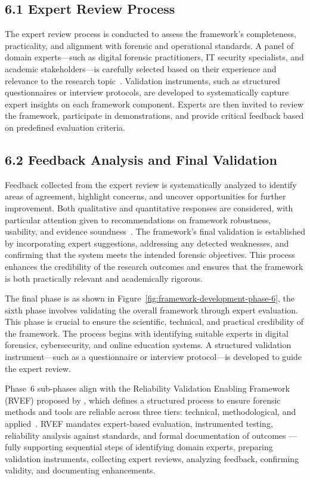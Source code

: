 \subsection{6.1 Expert Review Process}

The expert review process is conducted to assess the framework’s completeness, practicality, and alignment with forensic and operational standards. A panel of domain experts—such as digital forensic practitioners, IT security specialists, and academic stakeholders—is carefully selected based on their experience and relevance to the research topic~\cite{adel2024ethicore, hevner2004design}. Validation instruments, such as structured questionnaires or interview protocols, are developed to systematically capture expert insights on each framework component. Experts are then invited to review the framework, participate in demonstrations, and provide critical feedback based on predefined evaluation criteria.

\subsection{6.2 Feedback Analysis and Final Validation}

Feedback collected from the expert review is systematically analyzed to identify areas of agreement, highlight concerns, and uncover opportunities for further improvement. Both qualitative and quantitative responses are considered, with particular attention given to recommendations on framework robustness, usability, and evidence soundness~\cite{bass2012softwarearch}. The framework’s final validation is established by incorporating expert suggestions, addressing any detected weaknesses, and confirming that the system meets the intended forensic objectives. This process enhances the credibility of the research outcomes and ensures that the framework is both practically relevant and academically rigorous.

The final phase is as shown in Figure~\ref{fig:framework-development-phase-6}, the sixth phase involves validating the overall framework through expert evaluation. This phase is crucial to ensure the scientific, technical, and practical credibility of the framework. The process begins with identifying suitable experts in digital forensics, cybersecurity, and online education systems. A structured validation instrument—such as a questionnaire or interview protocol—is developed to guide the expert review.

Phase~6 sub-phases align with the Reliability Validation Enabling Framework (RVEF) proposed by \citet{stoykova2023rvef}, which defines a structured process to ensure forensic methods and tools are reliable across three tiers: technical, methodological, and applied~\cite{stoykova2023rvef}. RVEF mandates expert-based evaluation, instrumented testing, reliability analysis against standards, and formal documentation of outcomes — fully supporting sequential steps of identifying domain experts, preparing validation instruments, collecting expert reviews, analyzing feedback, confirming validity, and documenting enhancements.


